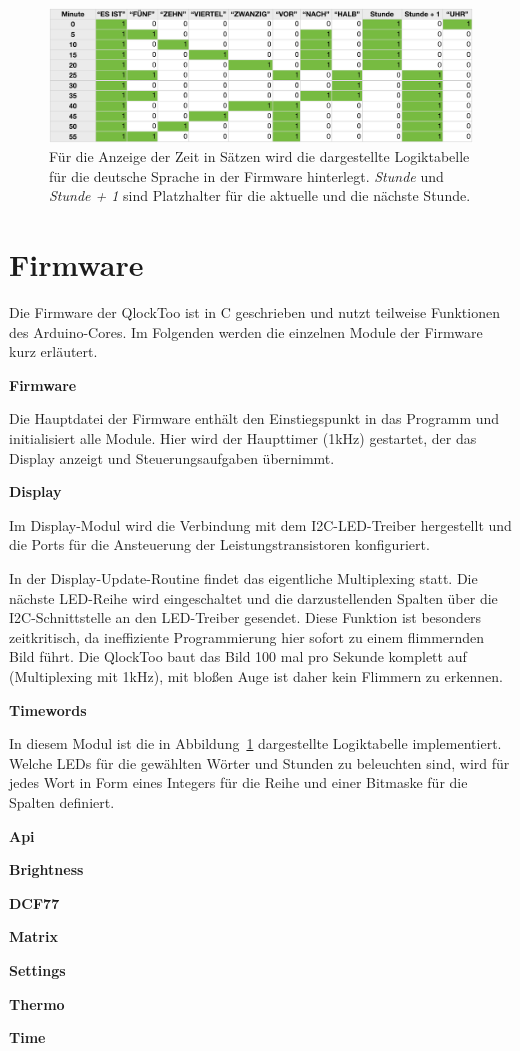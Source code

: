 
\begin{figure}
    \includegraphics[width=\columnwidth]{Abbildungen/Firmware/Logik}
    \caption{Für die Anzeige der Zeit in Sätzen wird die dargestellte Logiktabelle für die deutsche Sprache in der Firmware hinterlegt. \emph{Stunde} und \emph{Stunde + 1} sind Platzhalter für die aktuelle und die nächste Stunde.}
    \label{fig:Logik}
\end{figure}

\section{Firmware}
\label{sec:Firmware}

\begin{multicols}{2}
Die Firmware der QlockToo ist in C geschrieben und nutzt teilweise Funktionen des Arduino-Cores.
Im Folgenden werden die einzelnen Module der Firmware kurz erläutert.

\textbf{Firmware}

Die Hauptdatei der Firmware enthält den Einstiegspunkt in das Programm und initialisiert alle Module. Hier wird der Haupttimer (1kHz) gestartet, der das Display anzeigt und Steuerungsaufgaben übernimmt.

\textbf{Display}

Im Display-Modul wird die Verbindung mit dem I2C-LED-Treiber hergestellt und die Ports für die Ansteuerung der Leistungstransistoren konfiguriert.

In der Display-Update-Routine findet das eigentliche Multiplexing statt. Die nächste LED-Reihe wird eingeschaltet und die darzustellenden Spalten über die I2C-Schnittstelle an den LED-Treiber gesendet.
Diese Funktion ist besonders zeitkritisch, da ineffiziente Programmierung hier sofort zu einem flimmernden Bild führt.
Die QlockToo baut das Bild 100 mal pro Sekunde komplett auf (Multiplexing mit 1kHz), mit bloßen Auge ist daher kein Flimmern zu erkennen.

\textbf{Timewords}

In diesem Modul ist die in Abbildung~\ref{fig:Logik} dargestellte Logiktabelle implementiert.
Welche LEDs für die gewählten Wörter und Stunden zu beleuchten sind, wird für jedes Wort in Form eines Integers für die Reihe und einer Bitmaske für die Spalten definiert.

\textbf{Api}

\textbf{Brightness}

\textbf{DCF77}

\textbf{Matrix}

\textbf{Settings}

\textbf{Thermo}

\textbf{Time}

\end{multicols}
